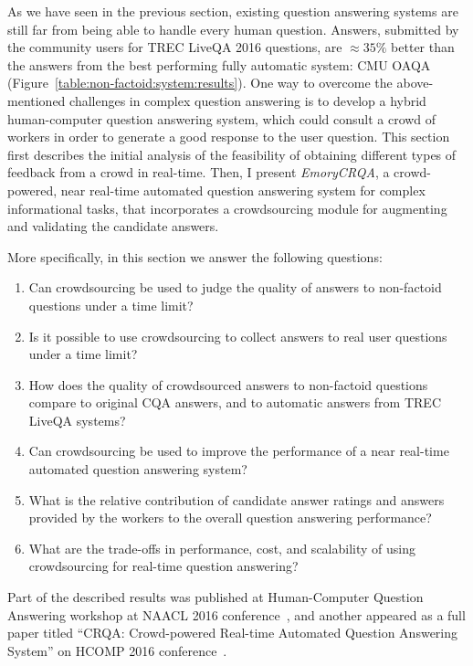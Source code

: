 As we have seen in the previous section, existing question answering systems are still far from being able to handle every human question.
Answers, submitted by the community users for TREC LiveQA 2016 questions, are $\approx 35\%$ better than the answers from the best performing fully automatic system: CMU OAQA (Figure~\ref{table:non-factoid:system:results}).
One way to overcome the above-mentioned challenges in complex question answering is to develop a hybrid human-computer question answering system, which could consult a crowd of workers in order to generate a good response to the user question.
This section first describes the initial analysis of the feasibility of obtaining different types of feedback from a crowd in real-time.
Then, I present \textit{EmoryCRQA}, a crowd-powered, near real-time automated question answering system for complex informational tasks, that incorporates a crowdsourcing module for augmenting and validating the candidate answers.

More specifically, in this section we answer the following questions:
\begin{enumerate}[noitemsep]
\item Can crowdsourcing be used to judge the quality of answers to non-factoid questions under a time limit?
\item Is it possible to use crowdsourcing to collect answers to real user questions under a time limit?
\item How does the quality of crowdsourced answers to non-factoid questions compare to original CQA answers, and to automatic answers from TREC LiveQA systems?
\item Can crowdsourcing be used to improve the performance of a near real-time automated question answering system?
\item What is the relative contribution of candidate answer ratings and answers provided by the workers to the overall question answering performance?
\item What are the trade-offs in performance, cost, and scalability of using crowdsourcing for real-time question answering?
\end{enumerate}

Part of the described results was published at Human-Computer Question Answering workshop at NAACL 2016 conference~\cite{savenkov_crowdsourcing2016a}, and another appeared as a full paper titled ``CRQA: Crowd-powered Real-time Automated Question Answering System'' on HCOMP 2016 conference~\cite{savenkov_crqa2016}.


